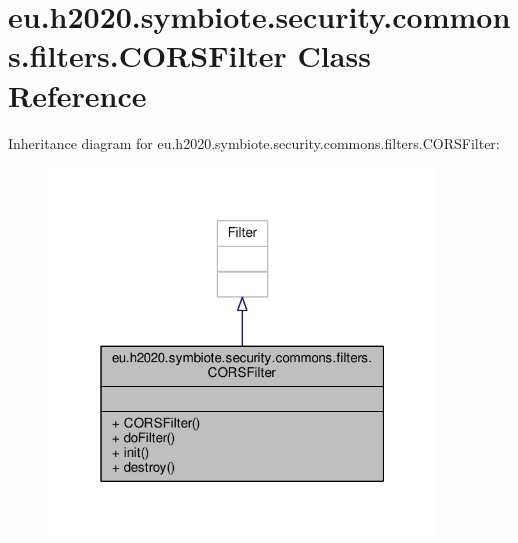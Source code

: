 \hypertarget{classeu_1_1h2020_1_1symbiote_1_1security_1_1commons_1_1filters_1_1CORSFilter}{}\section{eu.\+h2020.\+symbiote.\+security.\+commons.\+filters.\+C\+O\+R\+S\+Filter Class Reference}
\label{classeu_1_1h2020_1_1symbiote_1_1security_1_1commons_1_1filters_1_1CORSFilter}


Inheritance diagram for eu.\+h2020.\+symbiote.\+security.\+commons.\+filters.\+C\+O\+R\+S\+Filter\+:
\nopagebreak
\begin{figure}[H]
\begin{center}
\leavevmode
\includegraphics[width=292pt]{classeu_1_1h2020_1_1symbiote_1_1security_1_1commons_1_1filters_1_1CORSFilter__inherit__graph}
\end{center}
\end{figure}


